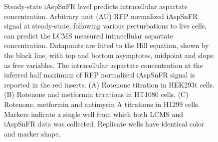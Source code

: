 \documentclass[9pt,lineno]{elife}
\begin{document}
\begin{figure}[ht!]
\centering
{}
\caption{
Steady-state iAspSnFR level predicts intracellular aspartate concentration.
Arbitrary unit (AU) RFP normalized iAspSnFR signal at steady-state, following various perturbations to live cells, can predict the LCMS measured intracellular aspartate concentration.
Datapoints are fitted to the Hill equation, shown by the black line, with top and bottom asymptotes, midpoint and slope as free variables.
The intracellular aspartate concentration at the inferred half maximum of RFP normalized iAspSnFR signal is reported in the red inserts.
(A) Rotenone titration in HEK293t cells.
(B) Rotenone and metformin titrations in HT1080 cells.
(C) Rotenone, metformin and antimycin A titrations in H1299 cells.
Markers indicate a single well from which both LCMS and iAspSnFR data was collected. Replicate wells have identical color and marker shape.
}
\label{fig:Fig3}
\end{figure}
\end{document}

